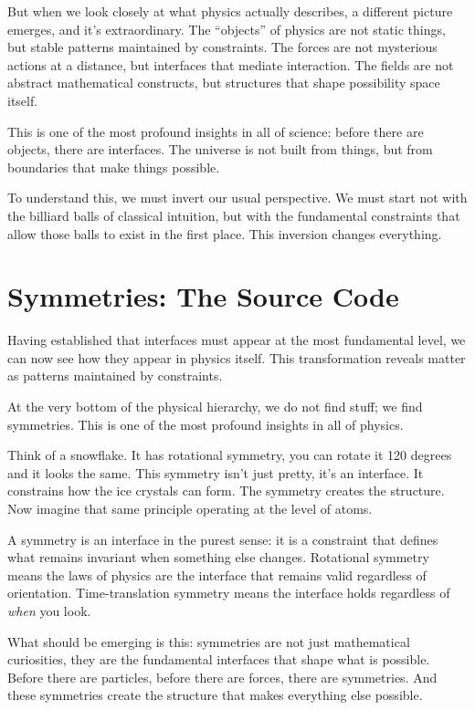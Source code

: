 \documentclass[
  openright]{book}
\begin{document}
But when we look closely at what physics actually describes, a different
picture emerges, and it's extraordinary. The ``objects'' of physics are
not static things, but stable patterns maintained by
constraints. The forces are not mysterious actions at
a distance, but interfaces that mediate interaction. The fields are not
abstract mathematical constructs, but structures that shape
possibility space itself.

This is one of the most profound insights in all of science: before
there are objects, there are interfaces. The universe is not built from
things, but from boundaries that make things possible.

To understand this, we must invert our usual perspective. We must start
not with the billiard balls of classical intuition, but with the
fundamental constraints that allow those balls to exist in the first
place. This inversion changes everything.

\section{Symmetries: The Source Code}\label{symmetries-the-source-code}

Having established that interfaces must appear at the most fundamental
level, we can now see how they appear in physics itself. This
transformation reveals matter as patterns maintained by constraints.

At the very bottom of the physical hierarchy, we do not find stuff; we
find symmetries. This is one of the most profound
insights in all of physics.

Think of a snowflake. It has rotational symmetry, you can rotate it 120
degrees and it looks the same. This symmetry isn't just pretty, it's an
interface. It constrains how the ice crystals can form. The symmetry
creates the structure. Now imagine that same principle operating at the
level of atoms.

A symmetry is an interface in the purest sense: it is a constraint that
defines what remains invariant when something else
changes. Rotational symmetry means the laws
of physics are the interface that remains valid regardless of
orientation. Time-translation symmetry
means the interface holds regardless of \emph{when} you look.

What should be emerging is this: symmetries are not just mathematical
curiosities, they are the fundamental interfaces that shape what is
possible. Before there are particles, before there are forces, there are
symmetries. And these symmetries create the structure that makes
everything else possible.
\end{document}

